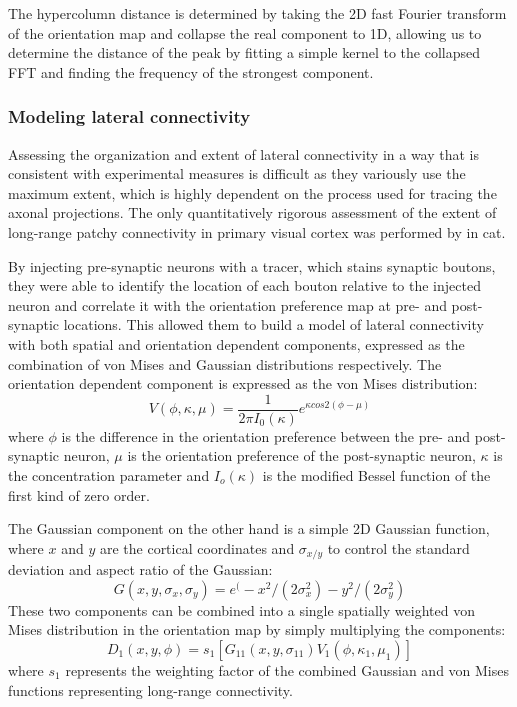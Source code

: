 The hypercolumn distance is determined by taking the 2D fast Fourier
transform of the orientation map and collapse the real component to
1D, allowing us to determine the distance of the peak by fitting a
simple kernel to the collapsed FFT and finding the frequency of the
strongest component.

\subsubsection*{Modeling lateral connectivity} \label{BuzasEquations}

Assessing the organization and extent of lateral connectivity in a way
that is consistent with experimental measures is difficult as they
variously use the maximum extent, which is highly dependent on the
process used for tracing the axonal projections. The only quantitatively
rigorous assessment of the extent of long-range patchy connectivity in
primary visual cortex was performed by \cite{Buzas2006} in cat.

By injecting pre-synaptic neurons with a tracer, which stains synaptic
boutons, they were able to identify the location of each bouton
relative to the injected neuron and correlate it with the orientation
preference map at pre- and post-synaptic locations. This allowed them
to build a model of lateral connectivity with both spatial and
orientation dependent components, expressed as the combination of von
Mises and Gaussian distributions respectively. The orientation
dependent component is expressed as the von Mises distribution:
\begin{equation}
V(\phi, \kappa, \mu) = \frac{1}{2 \pi I_0(\kappa)} e^{\kappa cos 2(\phi - \mu)}
\end{equation}
where $\phi$ is the difference in the orientation preference between
the pre- and post-synaptic neuron, $\mu$ is the orientation preference
of the post-synaptic neuron, $\kappa$ is the concentration parameter
and $I_o(\kappa)$ is the modified Bessel function of the first kind of
zero order.

The Gaussian component on the other hand is a simple 2D Gaussian
function, where $x$ and $y$ are the cortical coordinates and $\sigma_{x/y}$
to control the standard deviation and aspect ratio of the Gaussian:
\begin{equation}
G(x, y, \sigma_x, \sigma_y) = e^(-x^2/(2\sigma_x^2) - y^2/(2\sigma_y^2)
\end{equation}
These two components can be combined into a single spatially weighted
von Mises distribution in the orientation map by simply multiplying the
components:
\begin{equation}
D_1(x, y, \phi) = s_1 [G_{11}(x, y, \sigma_{11}) V_1(\phi, \kappa_1, \mu_1)]
\end{equation}
where $s_1$ represents the weighting factor of the combined Gaussian
and von Mises functions representing long-range connectivity.

